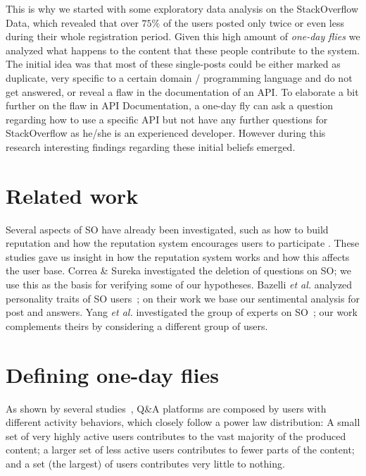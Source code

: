 \documentclass[conference]{IEEEtran}
\newcommand{\etal}{\emph{et al.}\xspace}
\begin{document}
This is why we started with some exploratory data analysis on the StackOverflow
Data, which revealed that over $75\%$ of the users posted only twice or even
less during their whole registration period. Given this high amount of
\textit{one-day flies} we analyzed what happens to the content that these
people contribute to the system. The initial idea was that most of these
single-posts could be either marked as duplicate, very specific to a certain
domain / programming language and do not get answered, or reveal a flaw in the
documentation of an API. To elaborate a bit further on the flaw in API
Documentation, a one-day fly can ask a question regarding how to use a specific
API but not have any further questions for StackOverflow as he/she is an
experienced developer. However during this research interesting findings
regarding these initial beliefs emerged.


\section{Related work}

Several aspects of SO have already been investigated, such as how to
build reputation \cite{bosu2013building} and how the reputation system
encourages users to participate \cite{movshovitz2013analysis}. These studies 
gave us insight in how the reputation system works and how this affects the user
base. 
Correa \& Sureka \cite{correa2014chaff} investigated the deletion of
questions on SO; we use this as the basis for verifying some of our hypotheses.
Bazelli \etal analyzed personality traits of SO
users~\cite{bazelli2013personality}; on their work we base our sentimental
analysis for post and answers. 
Yang \etal investigated the group of experts on
SO~\cite{yang2014sparrows}; our work complements theirs by considering a
different group of users.


\section{Defining one-day flies}

As shown by several studies~\cite{yang2014sparrows}, Q\&A platforms are
composed by users with different activity behaviors, which closely follow a
power law distribution: A small set of very highly active users contributes
to the vast majority of the produced content; a larger set of less active users
contributes to fewer parts of the content; and a set (the largest) of users
contributes very little to nothing.
\end{document}
